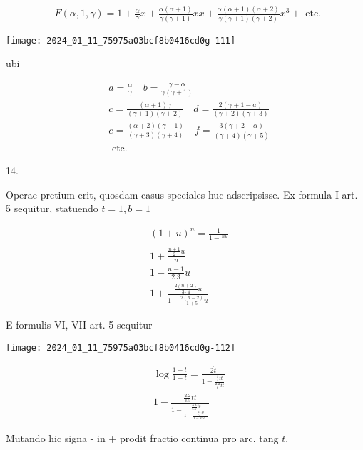 \documentclass[10pt]{article}
\begin{document}
\[
\begin{aligned}
& F(\alpha, 1, \gamma)=1+\frac{\alpha}{\gamma} x+\frac{\alpha(\alpha+1)}{\gamma(\gamma+1)} x x+\frac{\alpha(\alpha+1)(\alpha+2)}{\gamma(\gamma+1)(\gamma+2)} x^{3}+\text { etc. }
\end{aligned}
\]

\begin{center}
\texttt{[image: 2024\_01\_11\_75975a03bcf8b0416cd0g-111]}
\end{center}

ubi

\[
\begin{aligned}
& a=\frac{\alpha}{\gamma} \quad b=\frac{\gamma-\alpha}{\gamma(\gamma+1)} \\
& c=\frac{(\alpha+1) \gamma}{(\gamma+1)(\gamma+2)} \quad d=\frac{2(\gamma+1-a)}{(\gamma+2)(\gamma+3)} \\
& e=\frac{(\alpha+2)(\gamma+1)}{(\gamma+3)(\gamma+4)} \quad f=\frac{3(\gamma+2-\alpha)}{(\gamma+4)(\gamma+5)} \\
& \text { etc. }
\end{aligned}
\]

14.

Operae pretium erit, quosdam casus speciales huc adscripsisse. Ex formula I art. 5 sequitur, statuendo \(t=1, b=1\)

\[
\begin{aligned}
& (1+u)^{n}=\frac{1}{1-\frac{n u}{}} \\
& 1+\frac{\frac{n+1}{2} u}{n} \\
& 1-\frac{n-1}{2.3} u \\
& 1+\frac{\frac{2(n+2)}{3 \cdot 4} u}{1-\frac{2(n-2)}{1+5} u}
\end{aligned}
\]

E formulis VI, VII art. 5 sequitur

\begin{center}
\texttt{[image: 2024\_01\_11\_75975a03bcf8b0416cd0g-112]}
\end{center}

\[
\begin{aligned}
& \log \frac{1+t}{1-t}=\frac{2 \dot{t}}{1-\frac{\frac{1}{3} t t}{\frac{2.2}{t} t t}} \\
& 1-\frac{\frac{2.2}{3.5} t t}{1-\frac{\frac{3.3}{5.7} t t}{1-\frac{\frac{4.4}{7.9} t t}{1-\text { etc. }}}}
\end{aligned}
\]

Mutando hic signa - in + prodit fractio continua pro arc. tang \(t\).
\end{document}
